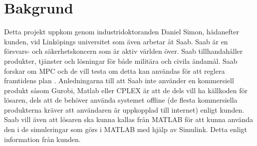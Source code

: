 \section{Bakgrund}    
Detta projekt uppkom genom industridoktoranden Daniel Simon, hädanefter kunden, vid Linköpings universitet som även arbetar åt Saab. Saab är en försvars- och säkerhetskoncern som är aktiv världen över. Saab tillhandahåller produkter, tjänster och lösningar för både militära och civila ändamål. \citep{SAABbrief}
\newline
\newline
Saab forskar om MPC och de vill testa om detta kan användas för att reglera framtidens plan \citep{danielSimon}.
Anledningarna till att Saab inte använder en kommersiell produkt såsom Gurobi, Matlab eller CPLEX är att de dels vill ha källkoden för lösaren, dels att de behöver använda systemet offline (de flesta kommersiella produkterna kräver att användaren är uppkopplad till internet) enligt kunden.  
\newline
\newline
Saab vill även att lösaren ska kunna kallas från MATLAB för att kunna använda den i de simuleringar som görs i MATLAB med hjälp av Simulink. Detta enligt information från kunden.  
